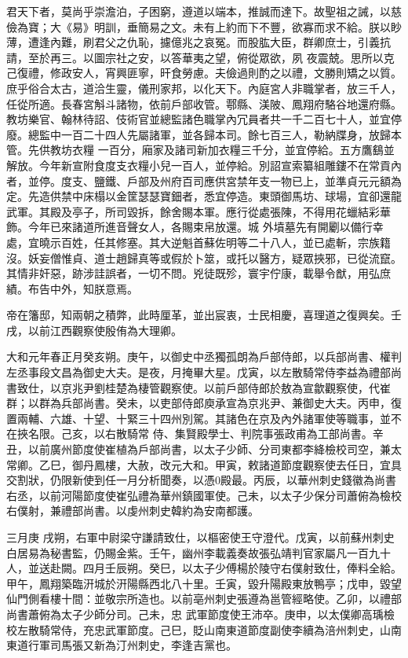 \begin{pinyinscope}
 君天下者，莫尚乎崇澹泊，子困窮，遵道以端本，推誠而達下。故聖祖之誡，以慈儉為寶；大《易》明訓，垂簡易之文。未有上約而下不豐，欲寡而求不給。朕以眇薄，遭逢內難，刷君父之仇恥，攄億兆之哀冤。而股肱大臣，群卿庶士，引義抗請，至於再三。以圖宗社之安，以答華夷之望，俯從眾欲，夙
 夜震兢。思所以克己復禮，修政安人，宵興匪寧，旰食勞慮。夫儉過則酌之以禮，文勝則矯之以質。庶乎俗合太古，道洽生靈，儀刑家邦，以化天下。內庭宮人非職掌者，放三千人，任從所適。長春宮斛斗諸物，依前戶部收管。鄠縣、渼陂、鳳翔府駱谷地還府縣。教坊樂官、翰林待詔、伎術官並總監諸色職掌內冗員者共一千二百七十人，並宜停廢。總監中一百二十四人先屬諸軍，並各歸本司。餘七百三人，勒納牒身，放歸本管。先供教坊衣糧
 一百分，廂家及諸司新加衣糧三千分，並宜停給。五方鷹鷂並解放。今年新宣附食度支衣糧小兒一百人，並停給。別詔宣索纂組雕鏤不在常貢內者，並停。度支、鹽鐵、戶部及州府百司應供宮禁年支一物已上，並準貞元元額為定。先造供禁中床榻以金筐瑟瑟寶鈿者，悉宜停造。東頭御馬坊、球場，宜卻還龍武軍。其殿及亭子，所司毀拆，餘舍賜本軍。應行從處張陳，不得用花蠟結彩華飾。今年已來諸道所進音聲女人，各賜束帛放還。城
 外墳墓先有開劚以備行幸處，宜曉示百姓，任其修塞。其大逆魁首蘇佐明等二十八人，並已處斬，宗族籍沒。妖妄僧惟貞、道士趙歸真等或假於卜筮，或托以醫方，疑眾挾邪，已從流竄。其情非奸惡，跡涉詿誤者，一切不問。兇徒既殄，寰宇佇康，載舉令猷，用弘庶績。布告中外，知朕意焉。



 帝在籓邸，知兩朝之積弊，此時厘革，並出宸衷，士民相慶，喜理道之復興矣。壬戌，以前江西觀察使殷侑為大理卿。



 大和元年春正月癸亥朔。庚午，以御史中丞獨孤朗為戶部侍郎，以兵部尚書、權判左丞事段文昌為御史大夫。是夜，月掩畢大星。戊寅，以左散騎常侍李益為禮部尚書致仕，以京兆尹劉桂楚為棲管觀察使。以前戶部侍郎於敖為宣歙觀察使，代崔群；以群為兵部尚書。癸未，以吏部侍郎庾承宣為京兆尹、兼御史大夫。丙申，復置兩輔、六雄、十望、十緊三十四州別駕。其諸色在京及內外諸軍使等職事，並不在挾名限。己亥，以右散騎常
 侍、集賢殿學士、判院事張政甫為工部尚書。辛丑，以前廣州節度使崔植為戶部尚書，以太子少師、分司東都李絳檢校司空，兼太常卿。乙巳，御丹鳳樓，大赦，改元大和。甲寅，敕諸道節度觀察使去任日，宜具交割狀，仍限新使到任一月分析聞奏，以憑0殿最。丙辰，以華州刺史錢徽為尚書右丞，以前河陽節度使崔弘禮為華州鎮國軍使。己未，以太子少保分司蕭俯為檢校右僕射，兼禮部尚書。以虔州刺史韓約為安南都護。



 三月庚
 戌朔，右軍中尉梁守謙請致仕，以樞密使王守澄代。戊寅，以前蘇州刺史白居易為秘書監，仍賜金紫。壬午，幽州李載義奏故張弘靖判官家屬凡一百九十人，並送赴闕。四月壬辰朔。癸巳，以太子少傅楊於陵守右僕射致仕，俸料全給。甲午，鳳翔築臨汧城於汧陽縣西北八十里。壬寅，毀升陽殿東放鴨亭；戊申，毀望仙門側看樓十間：並敬宗所造也。以前亳州刺史張遵為邕管經略使。乙卯，以禮部尚書蕭俯為太子少師分司。己未，忠
 武軍節度使王沛卒。庚申，以太僕卿高瑀檢校左散騎常侍，充忠武軍節度。己巳，貶山南東道節度副使李續為涪州刺史，山南東道行軍司馬張又新為汀州刺史，李逢吉黨也。




\end{pinyinscope}
